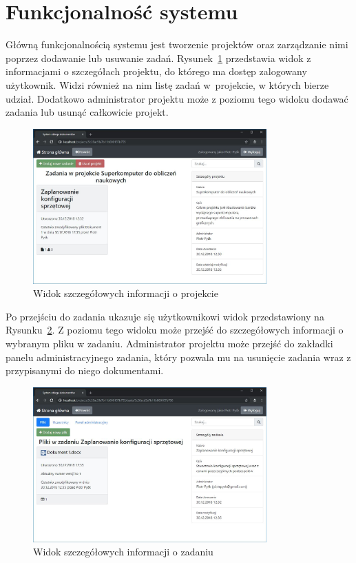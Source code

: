 \section{Funkcjonalność systemu}

Główną funkcjonalnością systemu jest tworzenie projektów oraz zarządzanie nimi poprzez dodawanie lub usuwanie zadań.
Rysunek~\ref{fig:sysFunProject} przedstawia widok z informacjami o szczegółach projektu, do którego ma dostęp zalogowany użytkownik.
Widzi również na nim listę zadań w~projekcie, w których bierze udział.
Dodatkowo administrator projektu może z poziomu tego widoku dodawać zadania lub usunąć całkowicie projekt.

\begin{figure}[!ht]
\centering
\includegraphics[width=0.8\textwidth]{figures/projekt.JPG}
\caption{Widok szczegółowych informacji o projekcie}
\label{fig:sysFunProject}
\end{figure}

Po przejściu do zadania ukazuje się użytkownikowi widok przedstawiony na Rysunku~\ref{fig:sysFunTask}.
Z poziomu tego widoku może przejść do szczegółowych informacji o wybranym pliku w zadaniu.
Administrator projektu może przejść do zakładki panelu administracyjnego zadania, który pozwala mu na usunięcie zadania wraz z przypisanymi do niego dokumentami.

\begin{figure}[!ht]
\centering
\includegraphics[width=0.8\textwidth]{figures/Zadanie.JPG}
\caption{Widok szczegółowych informacji o zadaniu}
\label{fig:sysFunTask}
\end{figure}

